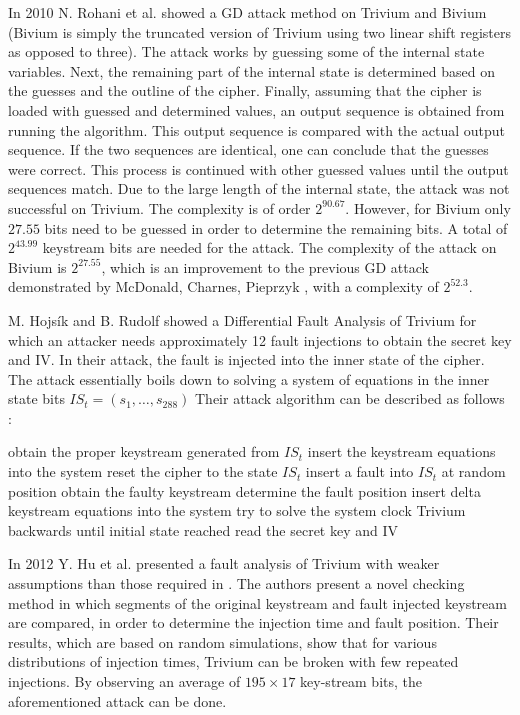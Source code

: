 \documentclass[conference]{IEEEtran}
\begin{document}
In 2010 N. Rohani et al. showed a GD attack method on Trivium and Bivium \cite{Rohani2010} (Bivium is simply the truncated version of Trivium using two linear shift registers as opposed to three).
The attack works by guessing some of the internal state variables. Next, the remaining part of the internal state is determined based on the guesses and the outline of the cipher. Finally, assuming that the cipher is loaded with guessed and determined values, an output sequence is obtained from running the algorithm. This output sequence is compared with the actual output sequence. If the two sequences are identical, one can conclude that the guesses were correct. This process is continued with other guessed values until the output sequences match. Due to the large length of the internal state, the attack was not successful on Trivium. The complexity is of order $2^{90.67}$. However, for Bivium only $27.55$ bits need to be guessed in order to determine the remaining bits. A total of $2^{43.99}$ keystream bits are needed for the attack. The complexity of the attack on Bivium is $2^{27.55}$, which is an improvement to the previous GD attack demonstrated by McDonald, Charnes, Pieprzyk \cite{biv-old}, with a complexity of $2^{52.3}$.

M. Hojsík and B. Rudolf \cite{Hojsik2008} showed a Differential Fault Analysis of Trivium for which an attacker needs approximately 12 fault injections to obtain the secret key and IV. In their attack, the fault is injected into the inner state of the cipher. 
The attack essentially boils down to solving a system of equations in the inner state bits $IS_t = (s_1,\dots, s_{288})$
Their attack algorithm can be described as follows \cite{Hojsik2008}:
\begin{algorithmic}[1]
\State obtain the proper keystream generated from $IS_t$ 
\State insert the keystream equations into the system 
\State reset the cipher to the state $IS_t$
\State insert a fault into $IS_t$ at random position
\State obtain the faulty keystream
\State determine the fault position
\State insert delta keystream equations into the system
\State try to solve the system
\EndWhile
\State clock Trivium backwards until initial state reached
\State read the secret key and IV
\end{algorithmic}

In 2012 Y. Hu et al. presented a fault analysis of Trivium \cite{Hu2012} with weaker assumptions than those required in \cite{Hojsik2008}. The authors present a novel checking method in which segments of the original keystream and fault injected keystream are compared, in order to determine the injection time and fault position. Their results, which are based on random simulations, show that for various distributions of injection times, Trivium can be broken with few repeated injections. By observing an average of $195 \times 17$ key-stream bits, the aforementioned attack can be done.
\end{document}
